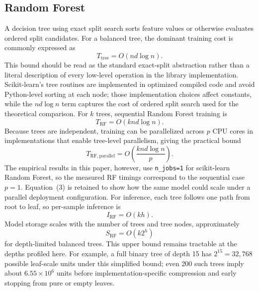 \documentclass[11pt]{article}
\begin{document}
\subsection{Random Forest}
A decision tree using exact split search sorts feature values or otherwise evaluates ordered split candidates. For a balanced tree, the dominant training cost is commonly expressed as
\begin{equation}
T_{\mathrm{tree}} = O(n d \log n).
\end{equation}
This bound should be read as the standard exact-split abstraction rather than a literal description of every low-level operation in the library implementation. Scikit-learn's tree routines are implemented in optimized compiled code and avoid Python-level sorting at each node; those implementation choices affect constants, while the $n d \log n$ term captures the cost of ordered split search used for the theoretical comparison.
For $k$ trees, sequential Random Forest training is
\begin{equation}
T_{\mathrm{RF}} = O(k n d \log n).
\end{equation}
Because trees are independent, training can be parallelized across $p$ CPU cores in implementations that enable tree-level parallelism, giving the practical bound
\begin{equation}
T_{\mathrm{RF,parallel}} = O\left(\frac{k n d \log n}{p}\right).
\end{equation}
The empirical results in this paper, however, use \texttt{n\_jobs=1} for scikit-learn Random Forest, so the measured RF timings correspond to the sequential case $p=1$. Equation~(3) is retained to show how the same model could scale under a parallel deployment configuration.
For inference, each tree follows one path from root to leaf, so per-sample inference is
\begin{equation}
I_{\mathrm{RF}} = O(kh).
\end{equation}
Model storage scales with the number of trees and tree nodes, approximately
\begin{equation}
S_{\mathrm{RF}} = O(k2^h)
\end{equation}
for depth-limited balanced trees. This upper bound remains tractable at the depths profiled here. For example, a full binary tree of depth 15 has $2^{15}=32{,}768$ possible leaf-scale units under this simplified bound; even 200 such trees imply about $6.55\times 10^6$ units before implementation-specific compression and early stopping from pure or empty leaves.
\end{document}
